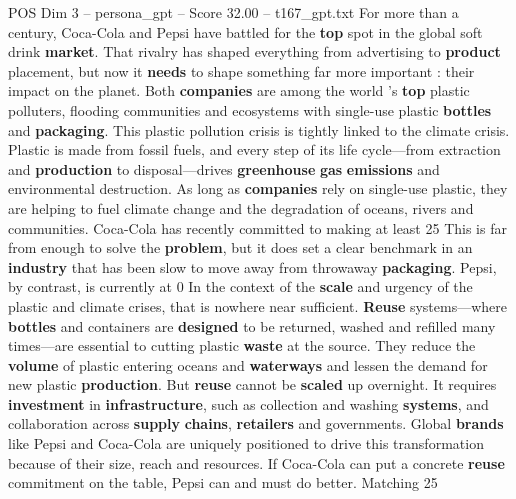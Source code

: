 \begin{textsample}{POS Dim 3 – persona\_gpt – Score 32.00 – t167\_gpt.txt}  \label{ex:f3_pos_028}
For more than a century, Coca-Cola and Pepsi have battled for the \textbf{top} spot in the global soft drink \textbf{market}.
That rivalry has shaped everything from advertising to \textbf{product} placement, but now it \textbf{needs} to shape something far more important : their impact on the planet.
Both \textbf{companies} are among the world ’s \textbf{top} plastic polluters, flooding communities and ecosystems with single-use plastic \textbf{bottles} and \textbf{packaging}.
This plastic pollution crisis is tightly linked to the climate crisis.
Plastic is made from fossil fuels, and every step of its life cycle—from extraction and \textbf{production} to disposal—drives \textbf{greenhouse} \textbf{gas} \textbf{emissions} and environmental destruction.
As long as \textbf{companies} rely on single-use plastic, they are helping to fuel climate change and the degradation of oceans, rivers and communities.
Coca-Cola has recently committed to making at least 25 %
This is far from enough to solve the \textbf{problem}, but it does set a clear benchmark in an \textbf{industry} that has been slow to move away from throwaway \textbf{packaging}.
Pepsi, by contrast, is currently at 0 %
In the context of the \textbf{scale} and urgency of the plastic and climate crises, that is nowhere near sufficient. \textbf{Reuse} systems—where \textbf{bottles} and containers are \textbf{designed} to be returned, washed and refilled many times—are essential to cutting plastic \textbf{waste} at the source.
They reduce the \textbf{volume} of plastic entering oceans and \textbf{waterways} and lessen the demand for new plastic \textbf{production}.
But \textbf{reuse} cannot be \textbf{scaled} up overnight.
It requires \textbf{investment} in \textbf{infrastructure}, such as collection and washing \textbf{systems}, and collaboration across \textbf{supply} \textbf{chains}, \textbf{retailers} and governments.
Global \textbf{brands} like Pepsi and Coca-Cola are uniquely positioned to drive this transformation because of their size, reach and resources.
If Coca-Cola can put a concrete \textbf{reuse} commitment on the table, Pepsi can and must do better.
Matching 25 %

\end{textsample}

